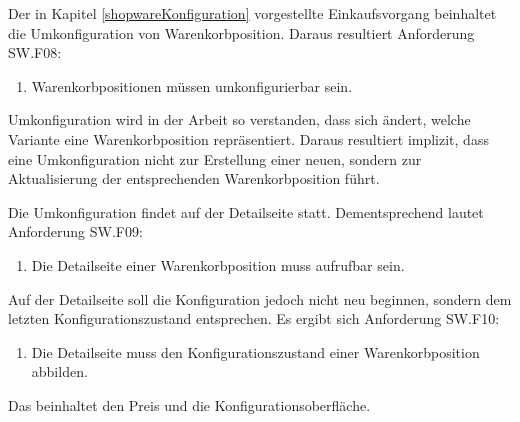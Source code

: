 \documentclass[11pt, a4paper, titlepage, listof=totoc, bibliography=totoc, index=totoc, twoside, openright, headings=normal, draft]{scrreprt}
\begin{document}
Der in Kapitel \ref{shopwareKonfiguration} vorgestellte Einkaufsvorgang beinhaltet die Umkonfiguration von Warenkorbposition. Daraus resultiert Anforderung SW.F08: 
\begin{enumerate}[SW.F08:]\bfseries
\item Warenkorbpositionen müssen umkonfigurierbar sein.
\end{enumerate}
Umkonfiguration wird in der Arbeit so verstanden, dass sich ändert, welche Variante eine Warenkorbposition repräsentiert. Daraus resultiert implizit, dass eine Umkonfiguration nicht zur Erstellung einer neuen, sondern zur Aktualisierung der entsprechenden Warenkorbposition führt.

Die Umkonfiguration findet auf der Detailseite statt. Dementsprechend lautet Anforderung SW.F09: 
\begin{enumerate}[SW.F09:]\bfseries
\item Die Detailseite einer Warenkorbposition muss aufrufbar sein.
\end{enumerate}
Auf der Detailseite soll die Konfiguration jedoch nicht neu beginnen, sondern dem letzten Konfigurationszustand entsprechen. Es ergibt sich Anforderung SW.F10:
\begin{enumerate}[SW.F10:]\bfseries
\item Die Detailseite muss den Konfigurationszustand einer Warenkorbposition abbilden.
\end{enumerate}
Das beinhaltet den Preis und die Konfigurationsoberfläche.
\end{document}
